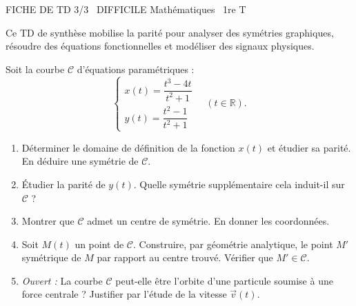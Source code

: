 \documentclass[11pt]{article}
\begin{document}
\begin{tcolorbox}[enhanced,colback=popink,colframe=popink,arc=10pt,boxrule=0pt,left=12pt,right=12pt,top=9pt,bottom=9pt]
{\color{white}\popxbold\small FICHE DE TD 3/3 \textbullet\ DIFFICILE \hfill Mathématiques \textbullet\ 1re T\par}
\end{tcolorbox}
\vspace{4pt}
Ce TD de synthèse mobilise la parité pour analyser des symétries graphiques, résoudre des équations fonctionnelles et modéliser des signaux physiques.

\begin{exercice}
Soit la courbe $\mathcal{C}$ d'équations paramétriques :
\[
\begin{cases}
x(t) = \dfrac{t^3 - 4t}{t^2 + 1} \\[1em]
y(t) = \dfrac{t^2 - 1}{t^2 + 1}
\end{cases}
\quad (t \in \mathbb{R}).
\]
\begin{enumerate}
    \item Déterminer le domaine de définition de la fonction $x(t)$ et étudier sa parité. En déduire une symétrie de $\mathcal{C}$.
    \item Étudier la parité de $y(t)$. Quelle symétrie supplémentaire cela induit-il sur $\mathcal{C}$ ?
    \item Montrer que $\mathcal{C}$ admet un centre de symétrie. En donner les coordonnées.
    \item Soit $M(t)$ un point de $\mathcal{C}$. Construire, par géométrie analytique, le point $M'$ symétrique de $M$ par rapport au centre trouvé. Vérifier que $M' \in \mathcal{C}$.
    \item \textit{Ouvert :} La courbe $\mathcal{C}$ peut-elle être l'orbite d'une particule soumise à une force centrale ? Justifier par l'étude de la vitesse $\vec{v}(t)$.
\end{enumerate}
\end{exercice}
\end{document}
